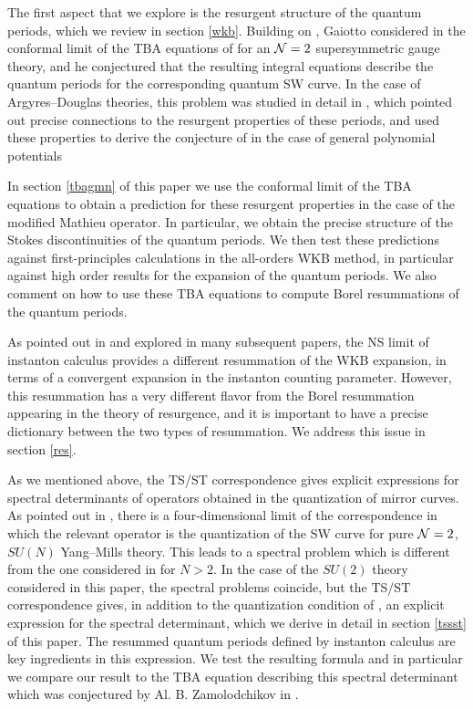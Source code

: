 \documentclass[a4paper,11pt]{article}
\theoremstyle{definition}
\newcommand{\CN}{{\cal N}}
\begin{document}
The first aspect that we explore is the resurgent structure of the
quantum periods, which we review in section \ref{wkb}. Building on
\cite{gmn2}, Gaiotto considered in \cite{oper} the conformal limit of
the TBA equations of \cite{gmn} for an $\CN=2$ supersymmetric gauge
theory, and he conjectured that the resulting integral equations
describe the quantum periods for the corresponding quantum SW
curve. In the case of Argyres--Douglas theories, this problem was
studied in detail in \cite{ims}, which pointed out precise connections
to the resurgent properties of these periods, and used these
properties to derive the conjecture of \cite{oper} in the case of
general polynomial potentials

In section \ref{tbagmn} of this paper we use the conformal limit of
the TBA equations to obtain a prediction for these
resurgent properties in the case of the modified Mathieu operator. In
particular, we obtain the precise structure of the Stokes
discontinuities of the quantum periods.  We then test these predictions against
first-principles calculations in the all-orders WKB method, in
particular against high order results for the expansion of the quantum
periods. We also comment on how to use these TBA equations to compute
Borel resummations of the quantum periods.

As pointed out in \cite{mirmor} and explored in many subsequent
papers, the NS limit of instanton calculus \cite{ns} provides a
different resummation of the WKB expansion, in terms of a convergent
expansion in the instanton counting parameter. However, this
resummation has a very different flavor from the Borel resummation
appearing in the theory of resurgence, and it is important to have a
precise dictionary between the two types of resummation.  We address
this issue in section \ref{res}.

As we mentioned above, the TS/ST correspondence gives explicit
expressions for spectral determinants of operators obtained in the
quantization of mirror curves.  As pointed out in \cite{gm3}, there is
a four-dimensional limit of the correspondence in which the relevant
operator is the quantization of the SW curve for pure ${\cal N}=2$,
$SU(N)$ Yang--Mills theory. This leads to a spectral problem which is
different from the one considered in \cite{ns} for $N>2$. In the case
of the $SU(2)$ theory considered in this paper, the spectral problems
coincide, but the TS/ST correspondence gives, in addition to the
quantization condition of \cite{ns}, an explicit expression for the
spectral determinant, which we derive in detail in section \ref{tssst}
of this paper.  The resummed quantum periods defined by instanton
calculus are key ingredients in this expression. We test the resulting
formula and in particular we compare our result to the TBA equation
describing this spectral determinant which was conjectured by
Al. B. Zamolodchikov in \cite{post-zamo}.
\end{document}
